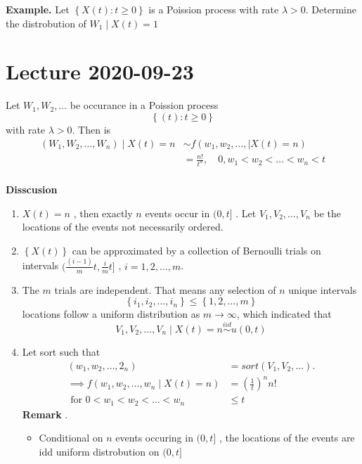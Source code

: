 \documentclass{article}
\theoremstyle{remark}
\begin{document}
\begin{tcolorbox}
  \textbf{Example.} Let $\left\{ X\left( t \right): t \ge 0 \right\}$ is a Poission process with rate $\lambda > 0$. Determine the distrobution of $W_{1}  \mid  X\left( t  \right) = 1$
\end{tcolorbox}

\newpage
\section{Lecture 2020-09-23}%
\label{sec:lecture_2020_09_23}



\begin{theorem}
  Let $W_{1}, W_{2} , \ldots$ be occurance in a Poission process \[
  \left\{ \left( t \right) : t \ge 0\right\}
  \]
  with rate $\lambda  > 0$. Then is \[
    \begin{split}
  \left( W_{1}, W_{2}, \ldots, W_{n} \right)  \mid  X\left( t \right)   = n   & \sim f\left( w_{1}, w_{2}, \ldots,  \mid  X\left( t \right) = n \right) \\
  &= \frac{n!}{t^{n} } , \quad  0, w_{1} < w_{2} < \ldots<   w_{n} < t   \\
    \end{split}
  \]
\end{theorem}
\textbf{Disscusion}
\begin{enumerate}[label=(\roman*)]
  \item $X\left( t \right) = n$ , then exactly $n$ events occur in $(0,t]$ . Let  $V_{1}, V_{2}, \ldots , V_{n}$ be the locations of the events not necessarily ordered.
\item $\left\{ X\left( t \right) \right\}$ can be approximated by a collection of Bernoulli trials on intervals $(  \frac{\left( i-1 \right)}{m} t, \frac{i}{m} t  ]$ , $i = 1, 2 , \ldots , m$.
\item The $m$ trials are independent. That means any selection of $n$ unique intervals \[
\left\{ i_{1}, i_{2}, \ldots, i_{n} \right\} \le \left\{ 1,2,\ldots, m \right\}
\]
locations follow a uniform distribution as $m \to  \infty$, which indicated that \[
V_{1}, V_{2}, \ldots, V_{n}  \mid  X\left( t \right) =n  \stackrel{iid}{\sim } u\left( 0,t \right)
\]
\item Let sort such that \[
    \begin{split}
\left( w_{1} , w_{2} , \ldots, 2_{n} \right)  & = sort\left( V_{1}, V_{2} , \ldots \right). \\
\implies  f\left( w_{1}, w_{2}, \ldots , w_{n}  \mid X\left( t \right) = n \right) &=  \left( \frac{1}{t} \right)^{n} n! \\
   \text{ for } 0< w_{1} < w_{2} < \ldots < w_{n}  & \le t
    \end{split}
\]
\textbf{Remark} .
\begin{itemize}
  \item Conditional on $n$ events occuring in $(0, t]$ ,  the locations of the events are idd uniform distrobution on  $(0,t]$
\end{itemize}
\end{enumerate}
\end{document}
